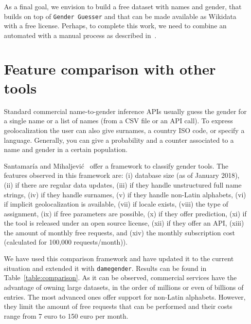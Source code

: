 \documentclass[a4paper]{article}
\begin{document}

As a final goal, we envision to build a free dataset with names and gender, that builds on top of \texttt{Gender Guesser} and that can be made available as Wikidata with a free license. 
Perhaps, to complete this work, we need to combine an automated with a manual process as described in~\cite{10.7717/peerj-cs.156}.



\section{Feature comparison with other tools}
\label{sec:comparison}

Standard commercial name-to-gender inference APIs usually guess the gender for a single name or a list of names (from a CSV file or an API call). 
To express geolocalization the user can also give surnames, a country ISO code, or specify a language.
Generally, you can give a probability and a counter associated to a name and gender in a certain population.

Santamaría and Mihaljevi\'c~\cite{10.7717/peerj-cs.156} offer a framework to classify gender tools.
The features observed in this framework are: (i) database size (as of January 2018), (ii) if there are regular data updates, (iii) if they handle unstructured full name strings, (iv) if they handle surnames, (v) if they handle non-Latin alphabets, (vi) if implicit geolocalization is available, (vii) if locale exists, (viii) the type of assignment, (ix) if free parameters are possible, (x) if they offer prediction, (xi) if the tool is released under an open source license, (xii) if they offer an API, (xiii) the amount of monthly free requests, and (xiv) the monthly subscription cost (calculated for 100,000 requests/month)).

We have used this comparison framework and have updated it to the current situation and extended it with \texttt{damegender}.
Results can be found in Table~\ref{table:comparison}.
As it can be observed, commercial services have the advantage of owning large datasets, in the order of millions or even of billions of entries.
The most advanced ones offer support for non-Latin alphabets.
However, they limit the amount of free requests that can be performed and their costs range from 7 euro to 150 euro per month.
\end{document}
